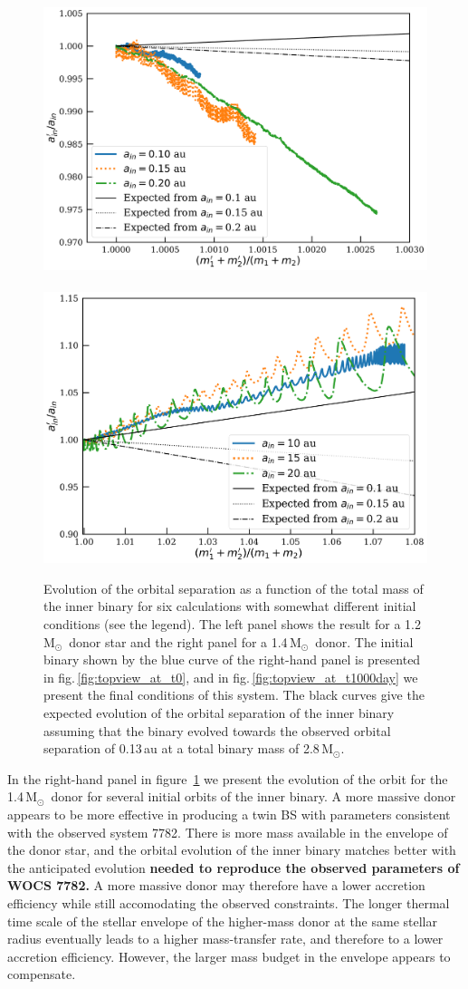 \documentclass[twocolumn]{aastex62}
\newcommand{\MSun}{\mbox{M$_\odot$}}
\begin{document}
\begin{figure}[ht!]
  \includegraphics[width=0.51\linewidth]{fig_orbital_evolution_for_12MSun.pdf}
~  \includegraphics[width=0.49\linewidth]{fig_orbital_evolution_for_14MSun.pdf}
  \caption{Evolution of the orbital separation as a function of the
    total mass of the inner binary for six calculations with somewhat
    different initial conditions (see the legend). The left panel
    shows the result for a 1.2\,\MSun\, donor star and the right panel
    for a 1.4\,\MSun\, donor. The initial binary shown by the blue
    curve of the right-hand panel is presented in
    fig.\,\ref{fig:topview_at_t0}, and in
    fig.\,\ref{fig:topview_at_t1000day} we present the final
    conditions of this system.  The black curves give the expected
    evolution of the orbital separation of the inner binary assuming
    that the binary evolved towards the observed orbital separation of
    0.13\,au at a total binary mass of 2.8\,\MSun.
\label{fig:mass_vs_semimajor_axis}}
\end{figure}

In the right-hand panel in figure~\ref{fig:mass_vs_semimajor_axis} we
present the evolution of the orbit for the 1.4\,\MSun\, donor for
several initial orbits of the inner binary. A more massive donor
appears to be more effective in producing a twin BS with parameters
consistent with the observed system 7782. There is more mass available
in the envelope of the donor star, and the orbital evolution of the
inner binary matches better with the anticipated evolution \textbf{needed to reproduce the observed parameters of WOCS 7782.}  A more
massive donor may therefore have a lower accretion efficiency while
still accomodating the observed constraints.  The longer thermal time
scale of the stellar envelope of the higher-mass donor at the same
stellar radius eventually leads to a higher mass-transfer rate, and
therefore to a lower accretion efficiency. However, the larger mass
budget in the envelope appears to compensate.
\end{document}
